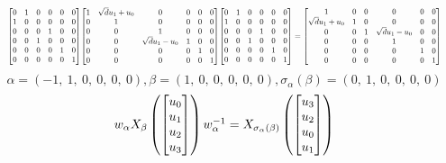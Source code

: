 \documentclass[11pt]{article}
\theoremstyle{definition}
\begin{document}
\[
\scaletoalign{\textwidth}{{\left[\begin{matrix}0 & 1 & 0 & 0 & 0 & 0\\1 & 0 & 0 & 0 & 0 & 0\\0 & 0 & 0 & 1 & 0 & 0\\0 & 0 & 1 & 0 & 0 & 0\\0 & 0 & 0 & 0 & 1 & 0\\0 & 0 & 0 & 0 & 0 & 1\end{matrix}\right]} {\left[\begin{matrix}1 & \sqrt{d} u_{1} + u_{0} & 0 & 0 & 0 & 0\\0 & 1 & 0 & 0 & 0 & 0\\0 & 0 & 1 & 0 & 0 & 0\\0 & 0 & \sqrt{d} u_{1} - u_{0} & 1 & 0 & 0\\0 & 0 & 0 & 0 & 1 & 0\\0 & 0 & 0 & 0 & 0 & 1\end{matrix}\right]} {\left[\begin{matrix}0 & 1 & 0 & 0 & 0 & 0\\1 & 0 & 0 & 0 & 0 & 0\\0 & 0 & 0 & 1 & 0 & 0\\0 & 0 & 1 & 0 & 0 & 0\\0 & 0 & 0 & 0 & 1 & 0\\0 & 0 & 0 & 0 & 0 & 1\end{matrix}\right]} = {\left[\begin{matrix}1 & 0 & 0 & 0 & 0 & 0\\\sqrt{d} u_{1} + u_{0} & 1 & 0 & 0 & 0 & 0\\0 & 0 & 1 & \sqrt{d} u_{1} - u_{0} & 0 & 0\\0 & 0 & 0 & 1 & 0 & 0\\0 & 0 & 0 & 0 & 1 & 0\\0 & 0 & 0 & 0 & 0 & 1\end{matrix}\right]}}
\]
\[
\alpha = \left( -1, \  1, \  0, \  0, \  0, \  0\right), \beta = \left( 1, \  0, \  0, \  0, \  0, \  0\right), \sigma_{\alpha}(\beta) = \left( 0, \  1, \  0, \  0, \  0, \  0\right)
\]
\[
\scaletoalign{\textwidth}{w_{\alpha} X_{\beta}\left(\left[\begin{matrix}u_{0}\\u_{1}\\u_{2}\\u_{3}\end{matrix}\right]\right) w_{\alpha}^{-1} = X_{\sigma_{\alpha}\left(\beta\right)}\left(\left[\begin{matrix}u_{3}\\u_{2}\\u_{0}\\u_{1}\end{matrix}\right]\right)}
\]
\end{document}
